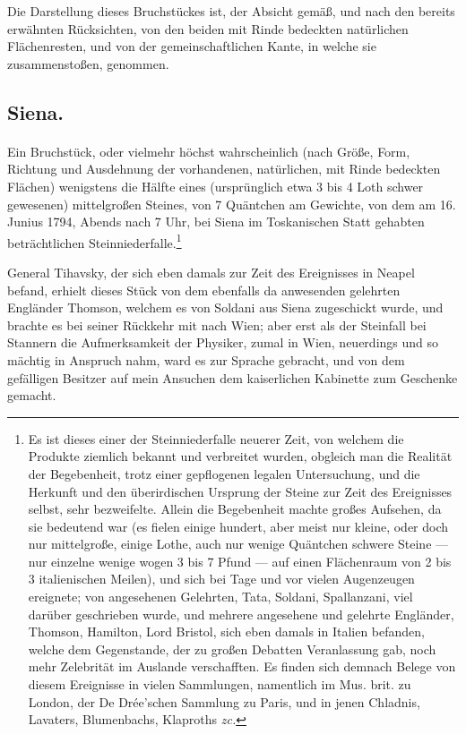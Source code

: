 \documentclass[a4paper, 11pt, oneside, german]{article}
\begin{document}
Die Darstellung dieses Bruchstückes ist, der Absicht gemäß, und nach den bereits erwähnten Rücksichten, von den beiden mit Rinde bedeckten natürlichen Flächenresten, und von der gemeinschaftlichen Kante, in welche sie zusammenstoßen, genommen.

\subsection{Siena.}
\paragraph{}
Ein Bruchstück, oder vielmehr höchst wahrscheinlich (nach Größe, Form, Richtung und Ausdehnung der vorhandenen, natürlichen, mit Rinde bedeckten Flächen) wenigstens die Hälfte eines (ursprünglich etwa 3 bis 4 Loth schwer gewesenen) mittelgroßen Steines, von 7 Quäntchen am Gewichte, von dem am 16. Junius 1794, Abends nach 7 Uhr, bei Siena im Toskanischen Statt gehabten beträchtlichen Steinniederfalle.\footnote{Es ist dieses einer der Steinniederfalle neuerer Zeit, von welchem die Produkte ziemlich bekannt und verbreitet wurden, obgleich man die Realität der Begebenheit, trotz einer gepflogenen legalen Untersuchung, und die Herkunft und den überirdischen Ursprung der Steine zur Zeit des Ereignisses selbst, sehr bezweifelte. Allein die Begebenheit machte großes Aufsehen, da sie bedeutend war (es fielen einige hundert, aber meist nur kleine, oder doch nur mittelgroße, einige Lothe, auch nur wenige Quäntchen schwere Steine --- nur einzelne wenige wogen 3 bis 7 Pfund --- auf einen Flächenraum von 2 bis 3 italienischen Meilen), und sich bei Tage und vor vielen Augenzeugen ereignete; von angesehenen Gelehrten, Tata, Soldani, Spallanzani, viel darüber geschrieben wurde, und mehrere angesehene und gelehrte Engländer, Thomson, Hamilton, Lord Bristol, sich eben damals in Italien befanden, welche dem Gegenstande, der zu großen Debatten Veranlassung gab, noch mehr Zelebrität im Auslande verschafften. Es finden sich demnach Belege von diesem Ereignisse in vielen Sammlungen, namentlich im Mus. brit. zu London, der De Drée'schen Sammlung zu Paris, und in jenen Chladnis, Lavaters, Blumenbachs, Klaproths \emph{zc.}}

General Tihavsky, der sich eben damals zur Zeit des Ereignisses in Neapel befand, erhielt dieses Stück von dem ebenfalls da anwesenden gelehrten Engländer Thomson, welchem es von Soldani aus Siena zugeschickt wurde, und brachte es bei seiner Rückkehr mit nach Wien; aber erst als der Steinfall bei Stannern die Aufmerksamkeit der Physiker, zumal in Wien, neuerdings und so mächtig in Anspruch nahm, ward es zur Sprache gebracht, und von dem gefälligen Besitzer auf mein Ansuchen dem kaiserlichen Kabinette zum Geschenke gemacht.
\end{document}
